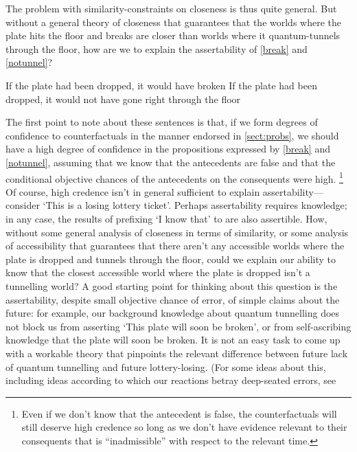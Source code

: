 \documentclass[If.tex]{subfiles}
\begin{document}

The problem with similarity-constraints on closeness is thus quite general. But without a general theory of closeness that guarantees that the worlds where the plate hits the floor and breaks are closer than worlds where it quantum-tunnels through the floor, how are we to explain the assertability of \ref{break} and \ref{notunnel}?
\begin{prop}
	\nitem \label{chancycfs}
\begin{prop}
	\aitem \label{break}
	  If the plate had been dropped, it would have broken
	\aitem \label{notunnel}
	  If the plate had been dropped, it would not have gone right through the floor
\end{prop}
\end{prop}
The first point to note about these sentences is that, if we form degrees of confidence to counterfactuals in the manner endorsed in \autoref{sect:probs}, we should have a high degree of confidence in the propositions expressed by \ref{break} and \ref{notunnel}, assuming that we know that the antecedents are false and that the conditional objective chances of the antecedents on the consequents were high.%
\footnote{Even if we don't know that the antecedent is false, the counterfactuals will still deserve high credence so long as we don't have evidence relevant to their consequents that is “inadmissible” with respect to the relevant time.} 
Of course, high credence isn't in general sufficient to explain assertability---consider ‘This is a losing lottery ticket’. Perhaps assertability requires knowledge; in any case, the results of prefixing ‘I know that’ to  are also assertible.  How, without some general analysis of closeness in terms of similarity, or some analysis of accessibility that guarantees that there aren't any accessible worlds where the plate is dropped and tunnels through the floor, could we explain our ability to know that the closest accessible world where the plate is dropped isn't a tunnelling world? A good starting point for thinking about this question is the assertability, despite small objective chance of error, of simple claims about the future: for example, our background knowledge about quantum tunnelling does not block us from asserting ‘This plate will soon be broken’, or from self-ascribing knowledge that the plate will soon be broken. It is not an easy task to come up with a workable theory that pinpoints the relevant difference between future lack of quantum tunnelling and future lottery-losing.  (For some ideas about this, including ideas according to which our reactions betray deep-seated errors, see
\end{document}
